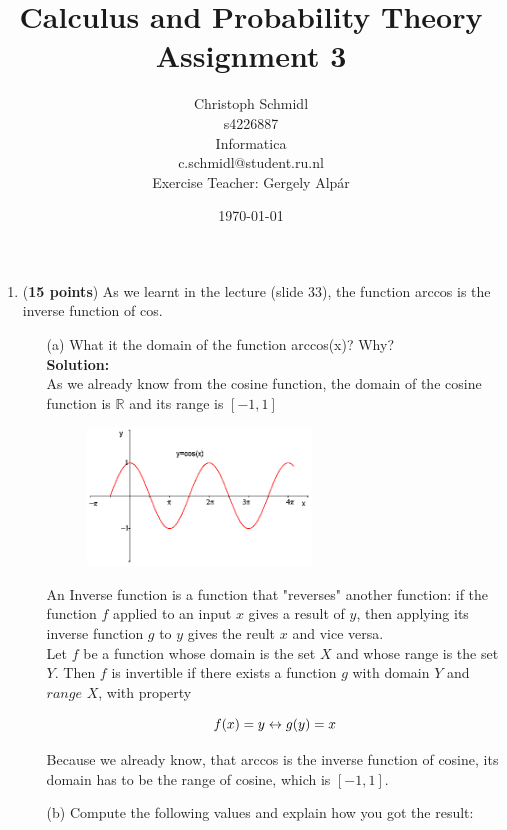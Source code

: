 \documentclass[a4paper]{article}
\title{Calculus and Probability Theory\\ Assignment 3}
\author{Christoph Schmidl\\
s4226887\\
Informatica\\
c.schmidl@student.ru.nl\\
Exercise Teacher: Gergely Alp\'{a}r}
\date{\today}
\begin{document}
\maketitle

\begin{enumerate}

\item (\textbf{15 points}) As we learnt in the lecture (slide 33), the function arccos is the inverse function of cos.

\begin{enumerate}
	\item[(a)] What it the domain of the function arccos(x)? Why?\\
	\textbf{Solution:}\\
	
As we already know from the cosine function, the domain of the cosine function is $\mathbb{R}$ and its range is $[-1,1]$	
	
\begin{figure}[ht]
	\centering
  \includegraphics[width=0.6\textwidth]{cosine.png}
\end{figure}	
	
An Inverse function is a function that "reverses" another function: if the function $f$ applied to an input $x$ gives a result of $y$, then applying its inverse function $g$ to $y$ gives the reult $x$ and vice versa.\\

Let $f$ be a function whose domain is the set $X$ and whose range is the set $Y$. Then $f$ is invertible if there exists a function $g$ with domain $Y$ and $range$ $X$, with property 

\begin{equation}
	f(x) = y \leftrightarrow g(y) = x \notag
\end{equation}	
	
Because we already know, that arccos is the inverse function of cosine, its domain has to be the range of cosine, which is $[-1,1]$.	
	
	\item[(b)] Compute the following values and explain how you got the result:\\
	

\end{enumerate}
\end{enumerate}
\end{document}
